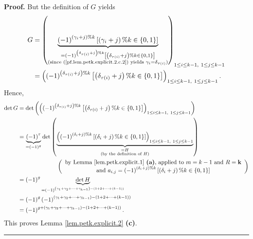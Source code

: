 \documentclass[numbers=enddot,12pt,final,onecolumn,notitlepage]{scrartcl}%
\theoremstyle{definition}
\newenvironment{proof}[1][Proof]{\noindent\textbf{#1.} }{\ \rule{0.5em}{0.5em}}
\begin{document}
\begin{proof}
But the definition of $G$ yields%
\begin{align*}
G  &  =\left(  \underbrace{\left(  -1\right)  ^{\left(  \gamma_{i}+j\right)
\%k}\left[  \left(  \gamma_{i}+j\right)  \%k\in\left\{  0,1\right\}  \right]
}_{\substack{=\left(  -1\right)  ^{\left(  \delta_{\tau\left(  i\right)
}+j\right)  \%k}\left[  \left(  \delta_{\tau\left(  i\right)  }+j\right)
\%k\in\left\{  0,1\right\}  \right]  \\\text{(since
(\ref{pf.lem.petk.explicit.2.c.2}) yields }\gamma_{i}=\delta_{\tau\left(
i\right)  }\text{)}}}\right)  _{1\leq i\leq k-1,\ 1\leq j\leq k-1}\\
&  =\left(  \left(  -1\right)  ^{\left(  \delta_{\tau\left(  i\right)
}+j\right)  \%k}\left[  \left(  \delta_{\tau\left(  i\right)  }+j\right)
\%k\in\left\{  0,1\right\}  \right]  \right)  _{1\leq i\leq k-1,\ 1\leq j\leq
k-1}.
\end{align*}
Hence,%
\begin{align*}
\det G  &  =\det\left(  \left(  \left(  -1\right)  ^{\left(  \delta
_{\tau\left(  i\right)  }+j\right)  \%k}\left[  \left(  \delta_{\tau\left(
i\right)  }+j\right)  \%k\in\left\{  0,1\right\}  \right]  \right)  _{1\leq
i\leq k-1,\ 1\leq j\leq k-1}\right) \\
&  =\underbrace{\left(  -1\right)  ^{\tau}}_{=\left(  -1\right)  ^{g}}%
\det\left(  \underbrace{\left(  \left(  -1\right)  ^{\left(  \delta
_{i}+j\right)  \%k}\left[  \left(  \delta_{i}+j\right)  \%k\in\left\{
0,1\right\}  \right]  \right)  _{1\leq i\leq k-1,\ 1\leq j\leq k-1}%
}_{\substack{=H\\\text{(by the definition of }H\text{)}}}\right) \\
&  \ \ \ \ \ \ \ \ \ \ \ \ \ \ \ \ \ \ \ \ \left(
\begin{array}
[c]{c}%
\text{by Lemma \ref{lem.petk.explicit.1} \textbf{(a)}, applied to }m=k-1\text{
and }R=\mathbf{k}\\
\text{and }a_{i,j}=\left(  -1\right)  ^{\left(  \delta_{i}+j\right)
\%k}\left[  \left(  \delta_{i}+j\right)  \%k\in\left\{  0,1\right\}  \right]
\end{array}
\right) \\
&  =\left(  -1\right)  ^{g}\underbrace{\det H}_{=\left(  -1\right)  ^{\left(
\gamma_{1}+\gamma_{2}+\cdots+\gamma_{k-1}\right)  -\left(  1+2+\cdots+\left(
k-1\right)  \right)  }}\\
&  =\left(  -1\right)  ^{g}\left(  -1\right)  ^{\left(  \gamma_{1}+\gamma
_{2}+\cdots+\gamma_{k-1}\right)  -\left(  1+2+\cdots+\left(  k-1\right)
\right)  }\\
&  =\left(  -1\right)  ^{g+\left(  \gamma_{1}+\gamma_{2}+\cdots+\gamma
_{k-1}\right)  -\left(  1+2+\cdots+\left(  k-1\right)  \right)  }.
\end{align*}
This proves Lemma \ref{lem.petk.explicit.2} \textbf{(c)}.
\end{proof}
\end{document}
